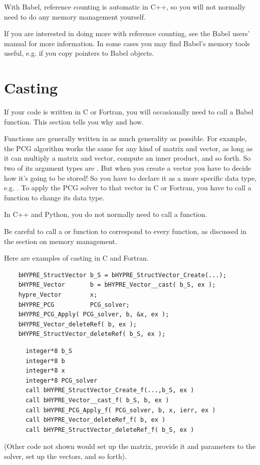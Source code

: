 With Babel, reference counting is automatic in C++, so you will not
normally need to do any memory management yourself.

If you are interested in doing more with reference counting, see the
Babel users' manual for more information.  In some cases you may find
Babel's memory tools useful, e.g. if you copy pointers to Babel
objects.


\section{Casting}

If your code is written in C or Fortran, you will occasionally need to
call a Babel  function.  This section tells you why and
how.

Functions are generally written in as much generality as possible.
For example, the PCG algorithm works the same for any kind of matrix
and vector, as long as it can multiply a matrix and vector, compute an
inner product, and so forth.  So two of its argument types are
.  But when you create a vector you have to decide
how it's going to be stored!  So you have to declare it as a more
specific data type, e.g. .  To apply the PCG
solver to that vector in C or Fortran, you have to call a 
function to change its data type.

In C++ and Python, you do not normally need to call a 
function.

Be careful to call a  or  function to
correspond to every  function, as discussed in the section
on memory management.

Here are examples of casting in C and Fortran.
\begin{verbatim}
    bHYPRE_StructVector b_S = bHYPRE_StructVector_Create(...);
    bHYPRE_Vector       b = bHYPRE_Vector__cast( b_S, ex );
    hypre_Vector        x;
    bHYPRE_PCG          PCG_solver;
    bHYPRE_PCG_Apply( PCG_solver, b, &x, ex );
    bHYPRE_Vector_deleteRef( b, ex );
    bHYPRE_StructVector_deleteRef( b_S, ex );
\end{verbatim}
\begin{verbatim}
      integer*8 b_S
      integer*8 b
      integer*8 x
      integer*8 PCG_solver
      call bHYPRE_StructVector_Create_f(...,b_S, ex )
      call bHYPRE_Vector__cast_f( b_S, b, ex )
      call bHYPRE_PCG_Apply_f( PCG_solver, b, x, ierr, ex )
      call bHYPRE_Vector_deleteRef_f( b, ex )
      call bHYPRE_StructVector_deleteRef_f( b_S, ex )
\end{verbatim}
(Other code not shown would set up the matrix, provide it and
parameters to the solver, set up the vectors, and so forth).

